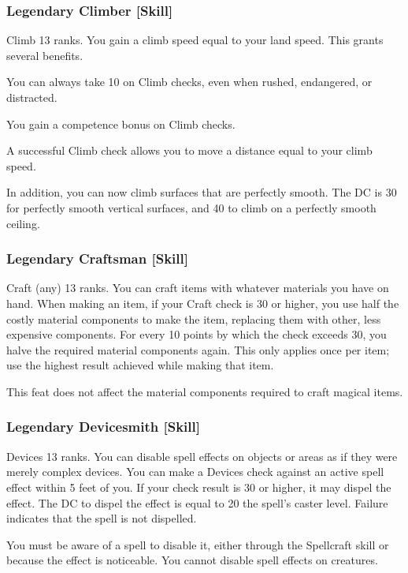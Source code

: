 \subsubsection{Legendary Climber [Skill]}
\featpre Climb 13 ranks.
\featben You gain a climb speed equal to your land speed. This grants several benefits. 
\begin{itemize*}
  \item You can always take 10 on Climb checks, even when rushed, endangered, or distracted. 
  \item You gain a  competence bonus on Climb checks.
  \item A successful Climb check allows you to move a distance equal to your climb speed.
\end{itemize*}

In addition, you can now climb surfaces that are perfectly smooth. The DC is 30 for perfectly smooth vertical surfaces, and 40 to climb on a perfectly smooth ceiling.

\subsubsection{Legendary Craftsman [Skill]}
\featpre Craft (any) 13 ranks.
\featben You can craft items with whatever materials you have on hand. When making an item, if your Craft check is 30 or higher, you use half the costly material components to make the item, replacing them with other, less expensive components. For every 10 points by which the check exceeds 30, you halve the required material components again. This only applies once per item; use the highest result achieved while making that item.

This feat does not affect the material components required to craft magical items.

\subsubsection{Legendary Devicesmith [Skill]}
\featpre Devices 13 ranks.
\featben You can disable spell effects on objects or areas as if they were merely complex devices. You can make a Devices check against an active spell effect within 5 feet of you. If your check result is 30 or higher, it may dispel the effect. The DC to dispel the effect is equal to 20 \add the spell's caster level. Failure indicates that the spell is not dispelled. 

You must be aware of a spell to disable it, either through the Spellcraft skill or because the effect is noticeable. You cannot disable spell effects on creatures.

